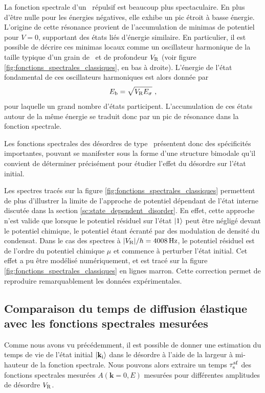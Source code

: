 La fonction spectrale d'un \speckle\ répulsif est beaucoup plus spectaculaire. En plus d'être nulle pour les énergies négatives, elle exhibe un pic étroit à basse énergie. L'origine de cette résonance provient de l'accumulation de minimas de potentiel pour $V=0$, supportant des états liés d'énergie similaire\citep{prat2016semiclassical}. En particulier, il est possible de décrire ces minimas locaux comme un oscillateur harmonique de la taille typique d'un grain de \speckle\ et de profondeur $V_{\mathrm{R}}$ (voir figure \ref{fig:fonctions_spectrales_classiques}, en bas à droite). L'énergie de l'état fondamental de ces oscillateurs harmoniques est alors donnée par 
\begin{equation}
E_{\mathrm{b}}=\sqrt{V_{\mathrm{R}}E_{\sigma}} \text{ ,}
\end{equation}
pour laquelle un grand nombre d'états participent. L'accumulation de ces états autour de la même énergie se traduit donc par un pic de résonance dans la fonction spectrale. 

Les fonctions spectrales des désordres de type \speckle\ présentent donc des spécificités importantes, pouvant se manifester sous la forme d'une structure bimodale qu'il convient de déterminer précisément pour étudier l'effet du désordre sur l'état initial. 

Les spectres tracés sur la figure \ref{fig:fonctions_spectrales_classiques} permettent de plus d'illustrer la limite de l'approche de potentiel dépendant de l'état interne discutée dans la section \ref{sc:state_dependent_disorder}. En effet, cette approche n'est valide que lorsque le potentiel résiduel sur l'état $\left| 1 \right\rangle$ peut être négligé devant le potentiel chimique, le potentiel étant écranté par des modulation de densité du condensat. Dans le cas des spectres à $|V_{\mathrm{R}}|/h=\SI{4008}{\hertz}$, le potentiel résiduel est de l'ordre du potentiel chimique $\mu$ et commence à perturber l'état initial. Cet effet a pu être modélisé numériquement, et est tracé sur la figure \ref{fig:fonctions_spectrales_classiques} en lignes marron. Cette correction permet de reproduire remarquablement les données expérimentales.


\subsection{Comparaison du temps de diffusion élastique avec les fonctions spectrales mesurées}
Comme nous avons vu précédemment, il est possible de donner une estimation du temps de vie de l'état initial $\left| \mathbf{k}_{\mathrm{i}} \right\rangle$ dans le désordre à l'aide de la largeur à mi-hauteur de la fonction spectrale. Nous pouvons alors extraire un temps $\tau_{\mathrm{s}}^{\mathrm{sf}}$ des fonctions spectrales mesurées $A(\mathbf{k}=0,E)$ mesurées pour différentes amplitudes de désordre $V_{\mathrm{R}}$.

